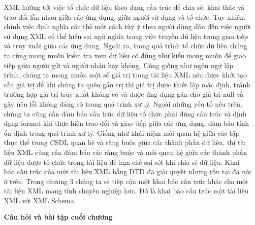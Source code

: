 XML hướng tới việc tổ chức dữ liệu theo dạng cấu trúc để chia sẻ, khai thác và trao đổi lẫn nhau giữa các ứng dụng, giữa người sử dụng và tổ chức. Tuy nhiên, chính việc định nghĩa các thẻ một cách tùy ý theo người dùng dẫn đến việc người sử dụng XML có thể hiểu sai ngữ nghĩa trong việc truyền dữ liệu trong giao tiếp và truy xuất giữa các ứng dụng. Ngoài ra, trong quá trình tổ chức dữ liệu chúng ta cũng mong muốn kiểm tra xem dữ liệu  có đúng như kiểu mong muốn để giao tiếp giữa người gửi và người nhận hay không. Cũng giống như ngôn ngữ lập trình, chúng ta mong muốn một số giá trị trong tài liệu XML nên được khởi tạo sẵn giá trị để khi chúng ta quên gán trị thì giá trị được thiết lập mặc định, tránh trường hợp giá trị truy xuất không có và được ứng dụng gán cho giá trị null và gây nên lỗi không đáng có trong quá trình xử lý. Ngoài những yếu tố nêu trên, chúng ta cũng cần đảm bảo cấu trúc dữ liệu tổ chức phải đúng cấu trúc và định dạng format khi thực hiện trao đổi và giao tiếp giữa các ứng dụng, đảm bảo tính ổn định trong quá trình xử lý. Giống như khái niệm mối quan hệ giữa các tập thực thể trong CSDL quan hệ và ràng buộc giữa các thành phần dữ liệu, thì tài liệu XML cũng cần đảm bảo các ràng buộc và mối quan hệ giữa các thành phần dữ liệu được tổ chức trong tài liệu để hạn chế sai sót khi chia sẻ dữ liệu. Khai báo cấu trúc của một tài liệu XML bằng DTD đã giải quyết những tồn tại đã nói ở trên. Trong chương 3 chúng ta sẽ tiếp cận một khai báo cấu trúc khác cho một tài liệu XML mang tính chuyên nghiệp hơn. Đó là khai báo cấu trúc một tài liệu XML với XML Schema.\\

\begin{center}
\textbf{Câu hỏi và bài tập cuối chương}
\end{center}

